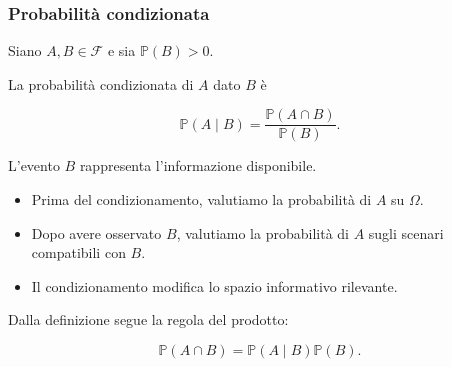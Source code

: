 \documentclass[handout]{beamer}%
\newenvironment{stepitemize}{\begin{itemize}[<+->]}{\end{itemize} }
\providecommand{\Prob}{\mathbb{P}}
\providecommand{\F}{\mathcal{F}}
\providecommand{\1}{\mathbf{1}}
\providecommand{\QTR}[2]{\csname #1\endcsname{#2}}
\begin{document}
\begin{frame}%
%

\frametitle{Probabilit\`{a} condizionata}%


Siano $A,B\in\F$ e sia $\Prob(B)>0$.

\medskip

La probabilit\`{a} condizionata di $A$ dato $B$ \`{e}%

\[
\Prob(A\mid B) = \frac{\Prob(A\cap B)}{\Prob(B)}.
\]


\medskip

L'evento $B$ rappresenta l'informazione disponibile.

\medskip

\begin{stepitemize}


\item Prima del condizionamento, valutiamo la probabilit\`{a} di $A$ su
$\Omega$.

\item Dopo avere osservato $B$, valutiamo la probabilit\`{a} di $A$ sugli
scenari compatibili con $B$.

\item Il condizionamento modifica lo spazio informativo rilevante.
\end{stepitemize}

\medskip

Dalla definizione segue la regola del prodotto:%

\[
\Prob(A\cap B)=\Prob(A\mid B)\Prob(B).
\]
%

\transboxout
\end{frame}%


%
\end{document}
